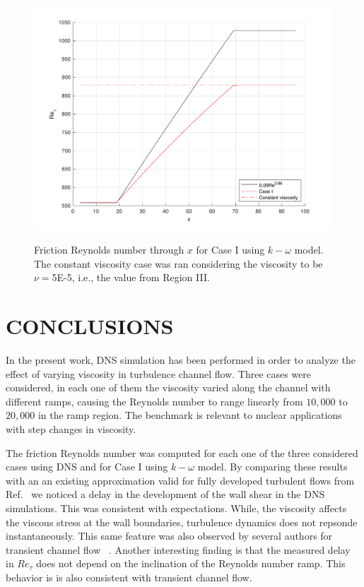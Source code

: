 \documentclass[twocolumn,10pt]{asme2e}
\begin{document}
\begin{figure}[t]
\centering
\scalebox{0.5}
{\includegraphics{Re_RANS.pdf}}
\caption{Friction Reynolds number through \(x\) for Case I using \(k-\omega\) model. The constant viscosity case was ran considering the viscosity to be \(\nu=\)5E-5, i.e., the value from Region III.}
\label{fig:Re_RANS}
\end{figure}

\section*{CONCLUSIONS}

In the present work, DNS simulation has been performed in order to analyze the effect of varying viscosity in turbulence channel flow. Three cases were considered, in each one of them the viscosity varied along the channel with different ramps, causing the Reynolds number to range linearly from \(10,000\) to \(20,000\) in the ramp region. The benchmark is relevant to nuclear applications with step changes in viscosity.

The friction Reynolds number was computed for each one of the three considered cases using DNS and for Case I using \(k-\omega\) model. By comparing these results with an an existing approximation valid for fully developed turbulent flows from Ref.~\cite{pope} we noticed a delay in the development of the wall shear in the DNS simulations. This was consistent with expectations. While, the viscosity affects the viscous stress at the wall boundaries, turbulence dynamics does not repsonde instantaneously. This same feature was also observed by several authors for transient channel flow ~\cite{maruyama1976,he2000,greenblatt2004,he2015}. Another interesting finding is that the measured delay in \(Re_{\tau}\) does not depend on the inclination of the Reynolds number ramp. This behavior is is also consistent with transient channel flow.
\end{document}
